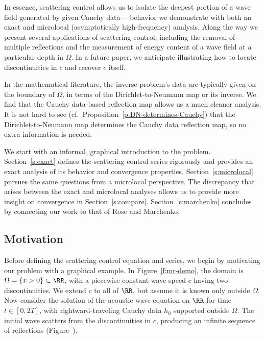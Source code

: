 \documentclass[10pt]{article}
\theoremstyle{plain}
\theoremstyle{definition}
\theoremstyle{remark}
\numberwithin{theorem}{section}
\numberwithin{example}{section}
\numberwithin{equation}{section}
\numberwithin{figure}{section}
\begin{document}
In essence, scattering control allows us to isolate the deepest portion of a wave field generated by given Cauchy data--- behavior we demonstrate with both an exact and microlocal (asymptotically high-frequency) analysis. Along the way we present several applications of scattering control, including the removal of multiple reflections and the measurement of energy content of a wave field at a particular depth in $\Omega$. In a future paper, we anticipate illustrating how to locate discontinuities in $c$ and recover $c$ itself.

In the mathematical literature, the inverse problem's data are typically given on the boundary of $\Omega$, in terms of the Dirichlet-to-Neumann map or its inverse. We find that the Cauchy data-based reflection map allows us a much cleaner analysis. It is not hard to see (cf.~Proposition~\ref{p:DN-determines-Cauchy}) that the Dirichlet-to-Neumann map determines the Cauchy data reflection map, so no extra information is needed.

We start with an informal, graphical introduction to the problem. Section~\ref{s:exact} defines the scattering control series rigorously and provides an exact analysis of its behavior and convergence properties. Section~\ref{s:microlocal} pursues the same questions from a microlocal perspective. The discrepancy that arises between the exact and microlocal analyses allows us to provide more insight on convergence in Section~\ref{s:compare}. Section~\ref{s:marchenko} concludes by connecting our work to that of Rose and Marchenko.


\subsection{Motivation}							\label{s:motivation}

Before defining the scattering control equation and series, we begin by motivating our problem with a graphical example. 
In Figure~\ref{f:mr-demo}, the domain is $\Omega=\{x>0\}\subset\RR$, with a piecewise constant wave speed $c$ having two discontinuities. We extend $c$ to all of $\RR$, but assume it is known only outside $\Omega$. Now consider the solution of the acoustic wave equation on $\RR$ for time $t\in[0,2T]$, with rightward-traveling Cauchy data $h_0$ supported outside $\Omega$. The initial wave scatters from the discontinuities in $c$, producing an infinite sequence of reflections (Figure~).
\end{document}
